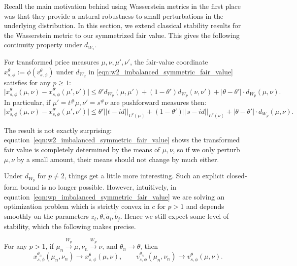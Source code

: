 \noindent Recall the main motivation behind using Wasserstein metrics in the first place was
that they provide a natural robustness to small perturbations in the underlying distribution.
In this section, we extend classical stability results for the Wasserstein metric to our symmetrized
fair value. This gives the following continuity property under $d_{W_2}$.

\begin{lemma}
    \label{lem:fv_continuity_w2}
    For transformed price measures $\mu,\nu,\mu',\nu'$, the fair-value coordinate $x_{s,\phi}^\theta:=\phi(v_{s,\phi}^\theta)$ under $d_{W_2}$ in \eqref{eqn:w2_imbalanced_symmetric_fair_value} satisfies for any $p \geq 1$:
    \begin{equation}
        \Big| x_{s,\phi}^\theta(\mu, \nu) - x_{s,\phi}^{\theta'}(\mu', \nu') \Big | \leq \theta' d_{W_p}(\mu,\mu') + (1-\theta') d_{W_p}(\nu,\nu') + |\theta-\theta'| \cdot d_{W_p}(\mu,\nu).
    \end{equation}
    \noindent In particular, if $\mu' = t^\# \mu, \nu' = s^\# \nu$ are pushforward measures then:
    \begin{equation}
        \Big| x_{s,\phi}^\theta(\mu, \nu) - x_{s,\phi}^{\theta'}(\mu', \nu') \Big | \leq \theta' ||t - id||_{L^p(\mu)} + (1-\theta') ||s-id||_{L^p(\nu)} + |\theta - \theta'| \cdot d_{W_p}(\mu,\nu).
    \end{equation}
\end{lemma}
%
The result is not exactly surprising: equation~\eqref{eqn:w2_imbalanced_symmetric_fair_value} shows the transformed fair value is completely determined by
the means of $\mu, \nu$, so if we only perturb $\mu, \nu$ by a small amount, their means should not change by much either.

Under $d_{W_p}$ for $p \neq 2$, things get a little more interesting.
Such an explicit closed-form bound is no longer possible. However, intuitively,
in equation~\eqref{eqn:wp_imbalanced_symmetric_fair_value} we are solving an optimization
problem which is strictly convex in $c$ for $p > 1$ and depends smoothly on the parameters
$z_\ell,\theta,\widetilde a_i,\widetilde b_j$. Hence we still expect some level of stability, which the following makes precise.

\begin{lemma}
    For any $p > 1$, if $\mu_n \xrightarrow{W_p} \mu, \nu_n \xrightarrow{W_p} \nu$, and $\theta_n \to \theta$, then
      \[x_{s,\phi}^{\theta_n}(\mu_n, \nu_n) \to x_{s,\phi}^\theta(\mu, \nu),
      \qquad v_{s,\phi}^{\theta_n}(\mu_n,\nu_n)\to v_{s,\phi}^\theta(\mu,\nu).\]
      \label{lem:wp_fv_stability}
\end{lemma}

